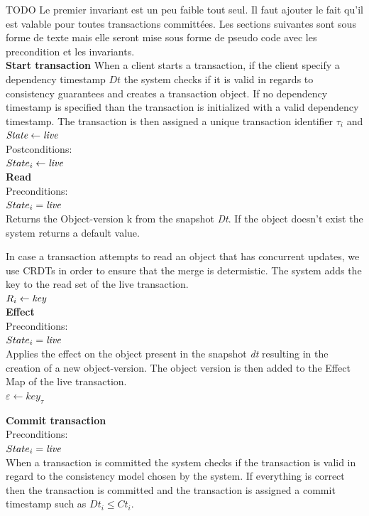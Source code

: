 \documentclass[systeme]{compas2022}
\begin{document}
TODO Le premier invariant est un peu faible tout seul. Il faut ajouter le fait qu'il est valable pour toutes transactions committées. Les sections suivantes sont sous forme de texte mais elle seront mise sous forme de pseudo code avec les precondition et les invariants.\\


\textbf{Start transaction}
When a client starts a transaction, if the client specify a dependency timestamp $Dt$ the system checks if it is valid in regards to consistency guarantees and creates a transaction object.
If no dependency timestamp is specified than the transaction is initialized with a valid dependency timestamp.
The transaction is then assigned a unique transaction identifier $\tau_i$ and $\emph{State} \leftarrow \emph{live}$ \\

Postconditions:\\
$State_i \leftarrow \emph{live}$ \\


\textbf{Read}\\
Preconditions:\\ 
$State_i = \emph{live}$ \\

Returns the Object-version k from the snapshot \emph{Dt}. 
If the object doesn't exist the system returns a default value.

In case a transaction attempts to read an object that has concurrent updates, we use CRDTs in order to ensure that the merge is determistic.
The system adds the key to the read set of the live transaction.\\
$R_i \leftarrow \emph{key}$\\

\textbf{Effect}\\
Preconditions:\\ 
$State_i = \emph{live}$ \\

Applies the effect on the object present in the snapshot \emph{dt} resulting in the creation of a new object-version.
The object version is then added to the Effect Map of the live transaction.\\
$\varepsilon \leftarrow key_{\tau}$

\textbf{Commit transaction}\\
Preconditions:\\ 
$State_i = \emph{live}$ \\

When a transaction is committed the system checks if the transaction is valid in regard to the consistency model chosen by the system.
If everything is correct then the transaction is committed and the transaction is assigned a commit timestamp such as $Dt_i \leq Ct_i$.
\end{document}
